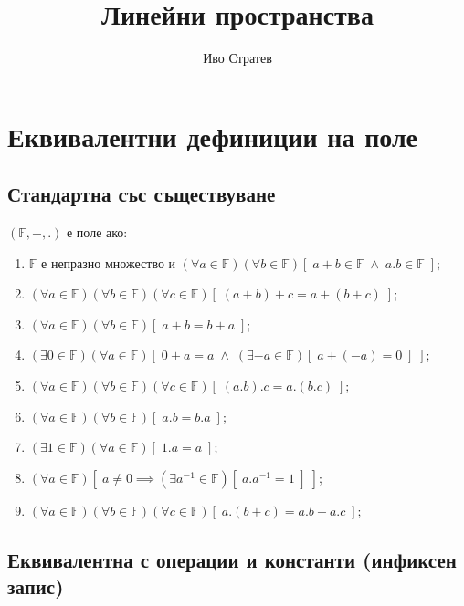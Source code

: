 \documentclass{article}[12pt]
\title{Линейни пространства}
\author{Иво Стратев}
\begin{document}
\maketitle

\tableofcontents

\pagebreak

\section{Еквивалентни дефиниции на поле}

\subsection{Стандартна със съществуване}

\((\mathbb{F}, +, .)\) е поле ако:

\begin{enumerate}
\item \(\mathbb{F}\) е непразно множество и \((\forall a \in \mathbb{F})(\forall b \in \mathbb{F})[\; a + b \in \mathbb{F} \; \land \; a.b \in \mathbb{F} \;]\);
\item \((\forall a \in \mathbb{F})(\forall b \in \mathbb{F})(\forall c \in \mathbb{F})[\; (a + b) + c = a + (b + c) \;]\);
\item \((\forall a \in \mathbb{F})(\forall b \in \mathbb{F})[\; a + b = b + a \;]\);
\item \((\exists 0 \in \mathbb{F})(\forall a \in \mathbb{F})[\; 0 + a = a \; \land \; (\exists -a \in \mathbb{F})[\; a + (-a) = 0 \;] \;]\);
\item \((\forall a \in \mathbb{F})(\forall b \in \mathbb{F})(\forall c \in \mathbb{F})[\; (a . b) . c = a . (b . c) \;]\);
\item \((\forall a \in \mathbb{F})(\forall b \in \mathbb{F})[\; a . b = b . a \;]\);
\item \((\exists 1 \in \mathbb{F})(\forall a \in \mathbb{F})[\; 1 . a = a \;]\);
\item \((\forall a \in \mathbb{F})[\; a \neq 0 \implies (\exists a^{-1} \in \mathbb{F})[\; a . a^{-1} = 1 \;] \;]\);
\item \((\forall a \in \mathbb{F})(\forall b \in \mathbb{F})(\forall c \in \mathbb{F})[\; a.(b + c) = a.b + a.c \;]\);
\end{enumerate}

\subsection{Еквивалентна с операции и константи (инфиксен запис)}
\end{document}
